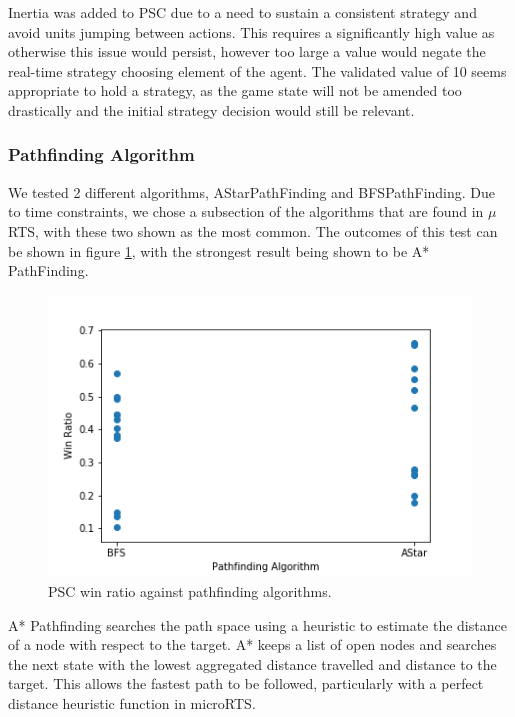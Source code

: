 \documentclass[]{article}
\begin{document}
Inertia was added to PSC due to a need to sustain a consistent strategy and avoid units jumping between actions. This requires a significantly high value as otherwise this issue would persist, however too large  a value would negate the real-time strategy choosing element of the agent. The validated value of 10 seems appropriate to hold a strategy, as the game state will not be amended too drastically and the initial strategy decision would still be relevant.

\subsubsection{Pathfinding Algorithm}

We tested 2 different algorithms, AStarPathFinding and BFSPathFinding. Due to time constraints, we chose a subsection of the algorithms that are found in $\mu$RTS, with these two shown as the most common. The outcomes of this test can be shown in figure \ref{fig:WinRatioAgainstPathfinding}, with the strongest result being shown to be A* PathFinding.

\begin{figure}
	\includegraphics[width=\linewidth]{WinRatioAgainstPathFinding.png}
	\caption{PSC win ratio against pathfinding algorithms.}
	\label{fig:WinRatioAgainstPathfinding}
\end{figure}

A* Pathfinding searches the path space using a heuristic to estimate the distance of a node with respect to the target. A* keeps a list of open nodes and searches the next state with the lowest aggregated distance travelled and distance to the target. This allows the fastest path to be followed, particularly with a perfect distance heuristic function in microRTS. 
\end{document}
